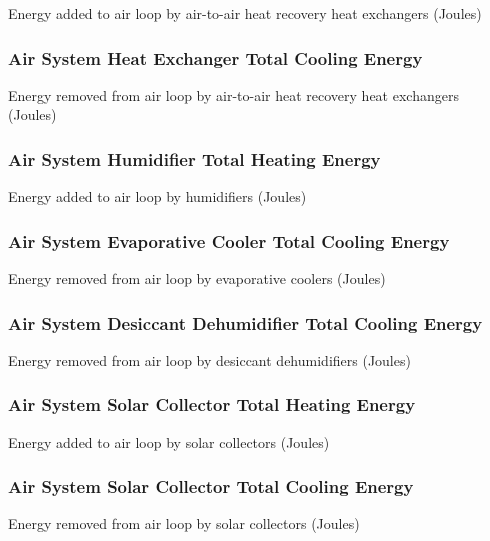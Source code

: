 Energy added to air loop by air-to-air heat recovery heat exchangers (Joules)

\subsubsection{Air System Heat Exchanger Total Cooling Energy}\label{air-system-heat-exchanger-total-cooling-energy}

Energy removed from air loop by air-to-air heat recovery heat exchangers (Joules)

\subsubsection{Air System Humidifier Total Heating Energy}\label{air-system-humidifier-total-heating-energy}

Energy added to air loop by humidifiers (Joules)

\subsubsection{Air System Evaporative Cooler Total Cooling Energy}\label{air-system-evaporative-cooler-total-cooling-energy}

Energy removed from air loop by evaporative coolers (Joules)

\subsubsection{Air System Desiccant Dehumidifier Total Cooling Energy}\label{air-system-desiccant-dehumidifier-total-cooling-energy}

Energy removed from air loop by desiccant dehumidifiers (Joules)

\subsubsection{Air System Solar Collector Total Heating Energy}\label{air-system-solar-collector-total-heating-energy}

Energy added to air loop by solar collectors (Joules)

\subsubsection{Air System Solar Collector Total Cooling Energy}\label{air-system-solar-collector-total-cooling-energy}

Energy removed from air loop by solar collectors (Joules)

